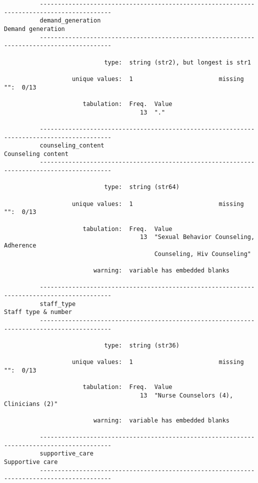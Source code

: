 \documentclass{article}
\begin{document}
\begin{verbatim}
          ------------------------------------------------------------------------------------------
          demand_generation                                                        Demand generation
          ------------------------------------------------------------------------------------------
          
                            type:  string (str2), but longest is str1
          
                   unique values:  1                        missing "":  0/13
          
                      tabulation:  Freq.  Value
                                      13  "."
          
          ------------------------------------------------------------------------------------------
          counseling_content                                                      Counseling content
          ------------------------------------------------------------------------------------------
          
                            type:  string (str64)
          
                   unique values:  1                        missing "":  0/13
          
                      tabulation:  Freq.  Value
                                      13  "Sexual Behavior Counseling, Adherence
                                          Counseling, Hiv Counseling"
          
                         warning:  variable has embedded blanks
          
          ------------------------------------------------------------------------------------------
          staff_type                                                             Staff type & number
          ------------------------------------------------------------------------------------------
          
                            type:  string (str36)
          
                   unique values:  1                        missing "":  0/13
          
                      tabulation:  Freq.  Value
                                      13  "Nurse Counselors (4), Clinicians (2)"
          
                         warning:  variable has embedded blanks
          
          ------------------------------------------------------------------------------------------
          supportive_care                                                            Supportive care
          ------------------------------------------------------------------------------------------
          

\end{verbatim}
\end{document}
